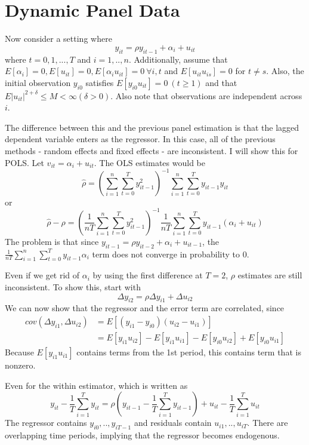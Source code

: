 \documentclass[12pt]{article}
\theoremstyle{definition}
\theoremstyle{property}
\theoremstyle{assumption}
\theoremstyle{example}
\theoremstyle{comment}
\begin{document}
\section{Dynamic Panel Data}
Now consider a setting where
\[
y_{it}=\rho y_{it-1}+\alpha_i +u_{it}
\]
where $t=0,1,...,T$ and $i=1,..,n$. Additionally, assume that $E[\alpha_i]=0, E[u_{it}]=0, E[\alpha_i u_{it}]=0 \ \forall i,t$ and $E[u_{it}u_{is}]=0$ for $t\neq s$. Also, the initial observation $y_{i0}$ satisfies $E[y_{i0}u_{it}]=0\ (t\geq1)$ and that $E|u_{it}|^{2+\delta}\leq M <\infty (\delta>0)$. Also note that observations are independent across $i$. \par
The difference between this and the previous panel estimation is that the lagged dependent variable enters as the regressor. In this case, all of the previous methods - random effects and fixed effects - are inconsistent. I will show this for POLS. Let $v_{it}=\alpha_i + u_{it}$. The OLS estimates would be
\small{\[
\hat{\rho}=\left(\sum_{i=1}^n \sum_{t=0}^Ty_{it-1}^2 \right)^{-1}\sum_{i=1}^n \sum_{t=0}^Ty_{it-1}y_{it}
\]}\normalsize
or
\small{\[
\hat{\rho}-\rho = \left(\frac{1}{nT}\sum_{i=1}^n \sum_{t=0}^Ty_{it-1}^2 \right)^{-1}\frac{1}{nT}\sum_{i=1}^n \sum_{t=0}^Ty_{it-1}(\alpha_i + u_{it})
\]}\normalsize
The problem is that since $y_{it-1}= \rho y_{it-2}+\alpha_i + u_{it-1}$, the $\frac{1}{nT}\sum_{i=1}^n \sum_{t=0}^Ty_{it-1}\alpha_i$ term does not converge in probability to 0.\par
Even if we get rid of $\alpha_i$ by using the first difference at $T=2$, $\rho$ estimates are still inconsistent. To show this, start with
\[
\Delta y_{i2}=\rho\Delta y_{i1}+\Delta u_{i2}
\]
We can now show that the regressor and the error term are correlated, since
\begin{align*}
cov(\Delta y_{i1}, \Delta u_{i2})&=E[(y_{i1}-y_{i0})(u_{i2}-u_{i1})]\\
 &=E[y_{i1}u_{i2}]-E[y_{i1}u_{i1}]-E[y_{i0}u_{i2}]+E[y_{i0}u_{i1}]
\end{align*}
Because $E[y_{i1}u_{i1}]$ contains terms from the 1st period, this contains term that is nonzero. \par
Even for the within estimator, which is written as
\[
y_{it}-\frac{1}{T}\sum_{i=1}^Ty_{it}=\rho\left(y_{it-1}-\frac{1}{T}\sum_{i=1}^Ty_{it-1}\right)+u_{it}-\frac{1}{T}\sum_{i=1}^Tu_{it}
\]
The regressor contains $y_{i0},..,y_{iT-1}$ and residuals contain $u_{i1},..,u_{iT}$. There are overlapping time periods, implying that the regressor becomes endogenous.
\end{document}
